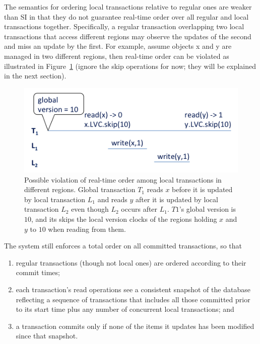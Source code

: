 The semantics for ordering local transactions relative to regular ones are
weaker than SI in that they do not guarantee real-time order over all regular
and local transactions together. Specifically, a regular transaction overlapping
two local transactions that access different regions may observe the updates of
the second and miss an update by the first. For example, assume objects x and y
are managed in two different regions, then real-time order can be violated as
illustrated in Figure~\ref{fig:ltx-rt} (ignore the skip operations for now; they will be explained in the next section).

\begin{figure}[h]
\includegraphics[width=\columnwidth]{LTX-RT}
\caption{Possible violation of real-time order among local transactions in different regions. Global transaction $T_1$
reads $x$ before it is updated by local transaction $L_1$ and reads $y$ after it is updated by local transaction $L_2$ even 
though $L_2$ occurs after $L_1$. $T1$'s global version is $10$, and its skips the local version clocks of the regions holding $x$ and $y$ to $10$ when reading from them.}
\label{fig:ltx-rt}
\end{figure}

The system still enforces a total order on all committed transactions, so that
\begin{enumerate}
    \setlength{\itemsep}{0pt}
    \setlength{\parskip}{0pt}
    \setlength{\parsep}{2pt}  
\item
regular transactions (though not local ones) are ordered according to their commit times;
\item
each transaction's read operations see a consistent snapshot of the database reflecting 
a sequence of transactions that includes all those committed prior to
its start time plus any number of concurrent local transactions; and 
\item
 a transaction commits only if none of the items it updates has been modified since that snapshot.
 \end{enumerate}

